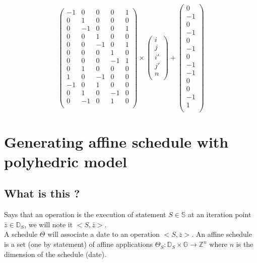 \begin{itemize}
$$\begin{pmatrix}
		-1 & 0  & 0  & 0  & 1  \\
		0  & 1  & 0  & 0  & 0  \\
		0  & -1 & 0  & 0  & 1  \\
		0  & 0  & 1  & 0  & 0  \\
		0  & 0  & -1 & 0  & 1  \\
		0  & 0  & 0  & 1  & 0  \\
		0  & 0  & 0  & -1 & 1  \\
		0  & 1  & 0  & 0  & 0  \\
		1  & 0  & -1 & 0  & 0  \\
		-1 & 0  & 1  & 0  & 0  \\
		0  & 1  & 0  & -1 & 0  \\
		0  & -1 & 0  & 1  & 0  \\
	\end{pmatrix}
	\times
	\begin{pmatrix}
		i  \\
		j  \\
		i' \\
		j' \\
		n  \\
	\end{pmatrix}
	+
	\begin{pmatrix}
		0  \\
		-1 \\
		0  \\
		-1 \\
		0  \\
		-1 \\
		0  \\
		-1 \\
		-1 \\
		0  \\
		0  \\
		-1 \\
		1  \\
	\end{pmatrix}$$
\end{itemize}


	\section{Generating affine schedule with polyhedric model}
	\label{polyhedric:schedule}

		\subsection{What is this ?}

	Says  that an operation is the execution of statement $S \in \mathbb{S}$ at an iteration point 
$\bar{z} \in \mathbb{D}_{S}$, we will note it $<\!S, \bar{z}\!>$.\\
	A schedule $\Theta$ will associate a date to an operation $<\!S, \bar{z}\!>$. An affine schedule is a set (one
by statement) of affine applications $\Theta_{S}: \mathbb{D}_{S} \times \mathbb{G} \rightarrow \mathbb{Z}^{n}$ where $n$
is the dimension of the schedule (date).

